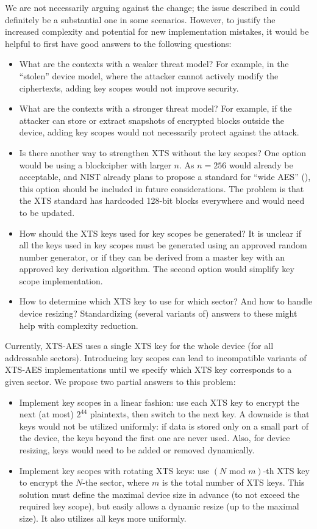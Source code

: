 \documentclass[a4paper]{article}
\begin{document}
We are not necessarily arguing against the change; the issue described in  could definitely be a substantial one in some scenarios. However, to justify the increased complexity and potential for new implementation mistakes, it would be helpful to first have good answers to the following questions:
\begin{itemize}
    \item What are the contexts with a weaker threat model? For example, in the ``stolen'' device model, where the attacker cannot actively modify the ciphertexts, adding key scopes would not improve security.
    \item What are the contexts with a stronger threat model? For example, if the attacker can store or extract snapshots of encrypted blocks outside the device, adding key scopes would not necessarily protect against the attack.
    \item Is there another way to strengthen XTS without the key scopes? One option would be using a blockcipher with larger $n$. As $n=256$ would already be acceptable, and NIST already plans to propose a standard for ``wide AES'' (\cite{nistwideaes}), this option should be included in future considerations. The problem is that the XTS standard \cite{IEEE1619-2018} has hardcoded 128-bit blocks everywhere and would need to be updated.
    \item How should the XTS keys used for key scopes be generated? It is unclear if all the keys used in key scopes must be generated using an approved random number generator, or if they can be derived from a master key with an approved key derivation algorithm. The second option would simplify key scope implementation.
    \item How to determine which XTS key to use for which sector? And how to handle device resizing? Standardizing (several variants of) answers to these might help with complexity reduction.
\end{itemize}

Currently, XTS-AES uses a single XTS key for the whole device (for all addressable sectors). Introducing key scopes can lead to incompatible variants of XTS-AES implementations until we specify which XTS key corresponds to a given sector. We propose two partial answers to this problem:
\begin{itemize}
    \item Implement key scopes in a linear fashion: use each XTS key to encrypt the next (at most) $2^{44}$ plaintexts, then switch to the next key. A downside is that keys would not be utilized uniformly: if data is stored only on a small part of the device, the keys beyond the first one are never used. Also, for device resizing, keys would need to be added or removed dynamically.

    \item Implement key scopes with rotating XTS keys: use $(N \text{ mod } m)$-th XTS key to encrypt the $N$-the sector, where $m$ is the total number of XTS keys.
    This solution must define the maximal device size in advance (to not exceed the required key scope), but easily allows a dynamic resize (up to the maximal size). It also utilizes all keys more uniformly.
\end{itemize}
\end{document}

